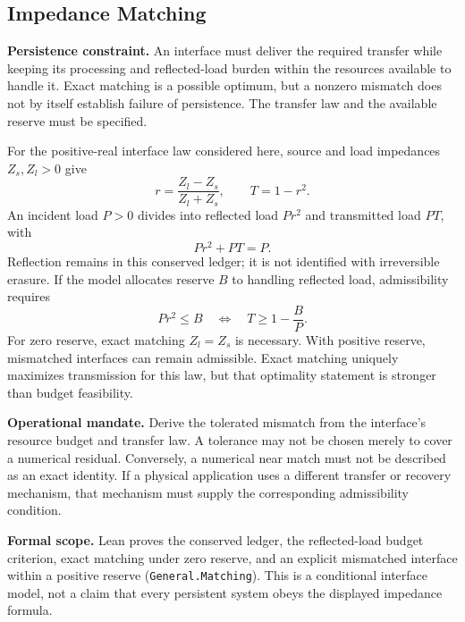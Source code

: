 \subsection{Impedance Matching}
\label{rule_impedance_matching}

\textbf{Persistence constraint.} An interface must deliver the required transfer while keeping its processing and reflected-load burden within the resources available to handle it. Exact matching is a possible optimum, but a nonzero mismatch does not by itself establish failure of persistence. The transfer law and the available reserve must be specified.

For the positive-real interface law considered here, source and load impedances $Z_s,Z_l>0$ give
\begin{equation}
    r=\frac{Z_l-Z_s}{Z_l+Z_s},
    \qquad T=1-r^2.
\end{equation}
An incident load $P>0$ divides into reflected load $Pr^2$ and transmitted load $PT$, with
\begin{equation}
    Pr^2+PT=P.
\end{equation}
Reflection remains in this conserved ledger; it is not identified with irreversible erasure. If the model allocates reserve $B$ to handling reflected load, admissibility requires
\begin{equation}
    Pr^2\leq B
    \quad\Longleftrightarrow\quad
    T\geq 1-\frac{B}{P}.
\end{equation}
For zero reserve, exact matching $Z_l=Z_s$ is necessary. With positive reserve, mismatched interfaces can remain admissible. Exact matching uniquely maximizes transmission for this law, but that optimality statement is stronger than budget feasibility.

\textbf{Operational mandate.} Derive the tolerated mismatch from the interface's resource budget and transfer law. A tolerance may not be chosen merely to cover a numerical residual. Conversely, a numerical near match must not be described as an exact identity. If a physical application uses a different transfer or recovery mechanism, that mechanism must supply the corresponding admissibility condition.

\textbf{Formal scope.} Lean proves the conserved ledger, the reflected-load budget criterion, exact matching under zero reserve, and an explicit mismatched interface within a positive reserve (\texttt{General.Matching}). This is a conditional interface model, not a claim that every persistent system obeys the displayed impedance formula.

